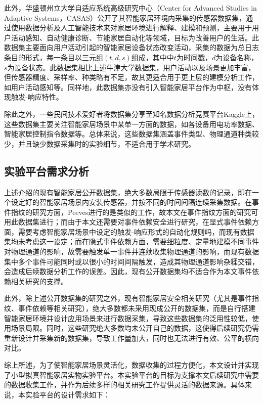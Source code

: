 此外，华盛顿州立大学自适应系统高级研究中心（Center for Advanced Studies in Adaptive Systems，CASAS）公开了其智能家居环境内采集的传感器数据集，通过使用数据分析及人工智能技术来对家居环境进行解释、建模和预测，主要用于用户活动感知、自动健康诊断、节能家居自动化等领域，目标为改善用户的生活。此数据集主要面向用户活动引起的智能家居设备状态改变活动，采集的数据为总日志条目的形式，每一条目以三元组$(t,d,s)$组成，其中中$t$为时间戳，$d$为设备名称，$s$为设备状态。此数据集相比上述牛津大学数据集，用户活动以及场景更加丰富，但传感器精度、采样率、种类略有不足，故其更适合用于更上层的建模分析工作，如用户活动感知等。同样地，此数据集亦没有引入智能家居平台作为中枢，没有体现触发-响应特性。

除此之外，一些民间技术爱好者将数据集分享至知名数据分析竞赛平台Kaggle上，这些数据集主要关注智能家居场景中某单一方面的数据，如各设备用电功率数据、智能家居控制指令数据等。总体来说，这些数据集涵盖事件类型、物理通道种类较少，并且缺少数据采集时的实验细节，不适合用于学术研究。

\subsection{实验平台需求分析}

上述介绍的现有智能家居公开数据集，绝大多数局限于传感器读数的记录，即在一个设定好的智能家居场景内安装传感器，并按不同的时间间隔连续采集数据。在事件指纹的研究方面，Peeves进行的是类似的工作，故本文在事件指纹方面的研究可用此数据集进行；而由于本文还需要对事件依赖安全进行研究，在显式事件依赖方面，需要考虑智能家居场景中设定的触发-响应形式的自动化规则吗，而现有数据集均未考虑这一设定；而在隐式事件依赖方面，需要细粒度、定量地建模不同事件对物理通道的影响，故需要触发单一事件并连续收集物理通道的影响，而现有数据集中多个事件可能同时或以很小的时间间隔触发，造成其物理通道影响杂糅交错，会造成后续数据分析工作的误差。因此，现有公开数据集均不适合作为本文事件依赖相关研究的支撑。

此外，除上述公开数据集的研究之外，现有智能家居安全相关研究（尤其是事件指纹、事件依赖等相关研究），绝大多数都未采用现成公开的数据集，而是自行搭建智能家居环境并设计应用场景来进行数据采集，导致这些数据集的泛用性较低，使用场景局限。同时，这些研究绝大多数均未公开自己的数据，这使得后续研究仍需重新设计并采集新的数据集，导致工作量加大，同时也无法进行有效、公平的横向对比。

综上所述，为了使智能家居场景灵活化，数据收集的过程方便化，本文设计并实现了小型拟真智能家居实物实验平台。本实验平台的目标为支撑本文后续研究中需要的数据收集工作，并作为后续多样的相关研究工作提供灵活的数据来源。具体来说，本实验平台的设计需求如下：


